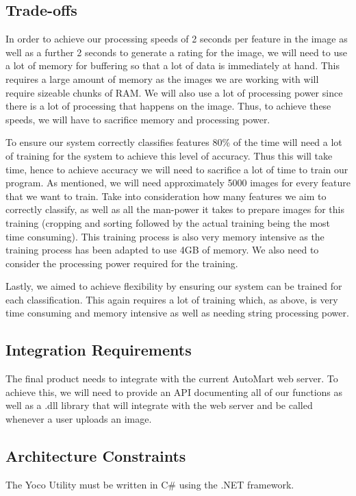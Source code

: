 \subsection{Trade-offs}
In order to achieve our processing speeds of 2 seconds per feature in the image as well as a further 2 seconds to generate a rating for the image, we will need to use a lot of memory for buffering so that a lot of data is immediately at hand. This requires a large amount of memory as the images we are working with will require sizeable chunks of RAM. We will also use a lot of processing power since there is a lot of processing that happens on the image. Thus, to achieve these speeds, we will have to sacrifice memory and processing power.

To ensure our system correctly classifies features 80\% of the time will need a lot of training for the system to achieve this level of accuracy. Thus this will take time, hence to achieve accuracy we will need to sacrifice a lot of time to train our program. As mentioned, we will need approximately 5000 images for every feature that we want to train. Take into consideration how many features we aim to correctly classify, as well as all the man-power it takes to prepare images for this training (cropping and sorting followed by the actual training being the most time consuming). This training process is also very memory intensive as the training process has been adapted to use 4GB of memory. We also need to consider the processing power required for the training.

Lastly, we aimed to achieve flexibility by ensuring our system can be trained for each classification. This again requires a lot of training which, as above, is very time consuming and memory intensive as well as needing string processing power.

\subsection{Integration Requirements}
The final product needs to integrate with the current AutoMart web server. To achieve this, we will need to provide an API documenting all of our functions as well as a .dll library that will integrate with the web server and be called whenever a user uploads an image.

\subsection{Architecture Constraints}
The Yoco Utility must be written in C\# using the .NET framework. 